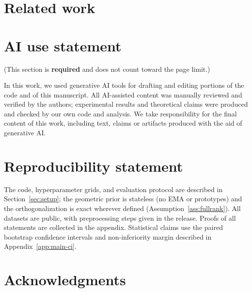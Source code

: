 \documentclass{article} %
\theoremstyle{plain}
\theoremstyle{remark}
\begin{document}
\section{Related work}
\label{sec:related}


\section*{AI use statement}

(This section is \textbf{required} and does not count toward the page limit.)

In this work, we used generative AI tools for drafting and editing portions of
the code and of this manuscript. All AI-assisted content was manually reviewed
and verified by the authors; experimental results and theoretical claims were
produced and checked by our own code and analysis. We take responsibility for
the final content of this work, including text, claims or artifacts produced
with the aid of generative AI.

\section*{Reproducibility statement}

The code, hyperparameter grids, and evaluation protocol are described in
Section~\ref{sec:setup}; the geometric prior is stateless (no EMA or prototypes)
and the orthogonalization is exact wherever defined (Assumption~\ref{ass:fullrank}).
All datasets are public, with preprocessing steps given in the release. Proofs
of all statements are collected in the appendix. Statistical claims use the
paired bootstrap confidence intervals and non-inferiority margin described in
Appendix~\ref{app:main-ci}.

\section*{Acknowledgments}






\appendix

\end{document}
